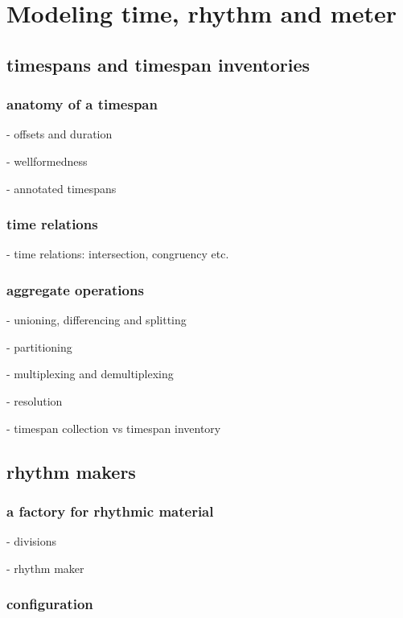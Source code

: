 \chapter{Modeling time, rhythm and meter}

\section{timespans and timespan inventories}

\subsection{anatomy of a timespan}

- offsets and duration

- wellformedness

- annotated timespans

\subsection{time relations}

- time relations: intersection, congruency etc.

\subsection{aggregate operations}

- unioning, differencing and splitting

- partitioning

- multiplexing and demultiplexing

- resolution

- timespan collection vs timespan inventory

\section{rhythm makers}

\subsection{a factory for rhythmic material}

- divisions

- rhythm maker

\subsection{configuration}

